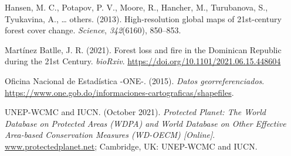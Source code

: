 \documentclass[10pt,landscape,a3paper]{article}
\newlength{\cslhangindent}
\newenvironment{CSLReferences}%
{\setlength{\parindent}{0pt}%
\everypar{\setlength{\hangindent}{\cslhangindent}}\ignorespaces}%
{\par}
\begin{document}
\hypertarget{refs}{}
\begin{CSLReferences}{1}{0}
\leavevmode\hypertarget{ref-hansen2013high}{}%
Hansen, M. C., Potapov, P. V., Moore, R., Hancher, M., Turubanova, S.,
Tyukavina, A., \ldots{} others. (2013). High-resolution global maps of
21st-century forest cover change. \emph{Science}, \emph{342}(6160),
850--853.

\leavevmode\hypertarget{ref-martinez2021forest}{}%
Martínez Batlle, J. R. (2021). {Forest loss and fire in the Dominican
Republic during the 21st Century}. \emph{bioRxiv}.
\url{https://doi.org/10.1101/2021.06.15.448604}

\leavevmode\hypertarget{ref-one2015datos}{}%
Oficina Nacional de Estadística -ONE-. (2015). \emph{Datos
georreferenciados}.
\url{https://www.one.gob.do/informaciones-cartograficas/shapefiles}.

\leavevmode\hypertarget{ref-unep2021protected}{}%
UNEP-WCMC and IUCN. (October 2021). \emph{{Protected Planet: The World
Database on Protected Areas (WDPA) and World Database on Other Effective
Area-based Conservation Measures (WD-OECM) {[}Online{]}}}.
\url{www.protectedplanet.net}; {Cambridge, UK: UNEP-WCMC and IUCN.}

\end{CSLReferences}




\newpage
\singlespacing 
\end{document}
